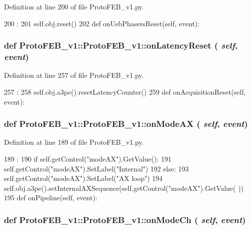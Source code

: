 Definition at line 200 of file ProtoFEB\_\-v1.py.


\begin{DoxyCode}
200                                   :
201         self.obj.reset()
202 
    def onUsbPhasersReset(self, event):
\end{DoxyCode}
\hypertarget{classProtoFEB__v1_1_1ProtoFEB__v1_a42fc231eef43b49ee7fe733711b6d8c4}{
\subsubsection[{onLatencyReset}]{\setlength{\rightskip}{0pt plus 5cm}def ProtoFEB\_\-v1::ProtoFEB\_\-v1::onLatencyReset ( {\em self}, \/   {\em event})}}
\label{classProtoFEB__v1_1_1ProtoFEB__v1_a42fc231eef43b49ee7fe733711b6d8c4}


Definition at line 257 of file ProtoFEB\_\-v1.py.


\begin{DoxyCode}
257                                    :
258         self.obj.a3pe().resetLatencyCounter()
259 
    def onAcquisitionReset(self, event):
\end{DoxyCode}
\hypertarget{classProtoFEB__v1_1_1ProtoFEB__v1_ac62afe73a8e95b214fc48701307d0a5f}{
\subsubsection[{onModeAX}]{\setlength{\rightskip}{0pt plus 5cm}def ProtoFEB\_\-v1::ProtoFEB\_\-v1::onModeAX ( {\em self}, \/   {\em event})}}
\label{classProtoFEB__v1_1_1ProtoFEB__v1_ac62afe73a8e95b214fc48701307d0a5f}


Definition at line 189 of file ProtoFEB\_\-v1.py.


\begin{DoxyCode}
189                              :
190         if self.getControl("modeAX").GetValue():
191             self.getControl("modeAX").SetLabel("Internal")
192         else:
193             self.getControl("modeAX").SetLabel("AX loop")
194         self.obj.a3pe().setInternalAXSequence(self.getControl("modeAX").GetValue(
      ))
195 
    def onPipeline(self, event):
\end{DoxyCode}
\hypertarget{classProtoFEB__v1_1_1ProtoFEB__v1_ac86f19c63e6d25c46c167c07f2f0146f}{
\subsubsection[{onModeCh}]{\setlength{\rightskip}{0pt plus 5cm}def ProtoFEB\_\-v1::ProtoFEB\_\-v1::onModeCh ( {\em self}, \/   {\em event})}}
\label{classProtoFEB__v1_1_1ProtoFEB__v1_ac86f19c63e6d25c46c167c07f2f0146f}


